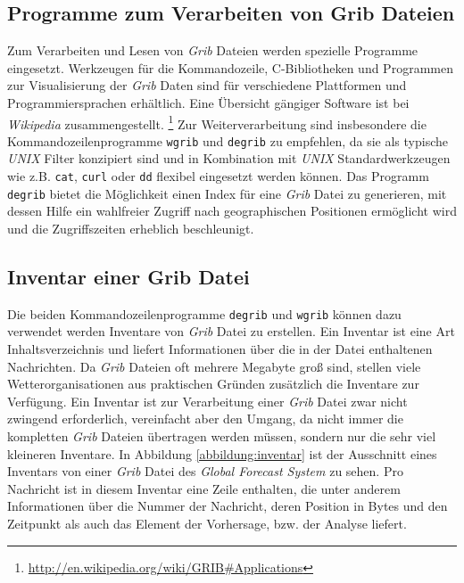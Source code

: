 \subsection{Programme zum Verarbeiten von Grib Dateien}
\label{grib-reader}

Zum Verarbeiten und Lesen von \textit{Grib} Dateien werden spezielle
Programme eingesetzt. Werkzeugen für die Kommandozeile, C-Bibliotheken
und Programmen zur Visualisierung der \textit{Grib} Daten sind für
verschiedene Plattformen und Programmiersprachen erhältlich. Eine
Übersicht gängiger Software ist bei \textit{Wikipedia}
zusammengestellt.
\footnote{\url{http://en.wikipedia.org/wiki/GRIB\#Applications}} Zur
Weiterverarbeitung sind insbesondere die Kommandozeilenprogramme
\texttt{wgrib} und \texttt{degrib} zu empfehlen, da sie als typische
\textit{UNIX} Filter konzipiert sind und in Kombination mit
\textit{UNIX} Standardwerkzeugen wie z.B. \texttt{cat}, \texttt{curl}
oder \texttt{dd} flexibel eingesetzt werden können. Das Programm
\texttt{degrib} bietet die Möglichkeit einen Index für eine
\textit{Grib} Datei zu generieren, mit dessen Hilfe ein wahlfreier
Zugriff nach geographischen Positionen ermöglicht wird und die
Zugriffszeiten erheblich beschleunigt.

\subsection{Inventar einer Grib Datei}

Die beiden Kommandozeilenprogramme \texttt{degrib} und \texttt{wgrib}
können dazu verwendet werden Inventare von \textit{Grib} Datei zu
erstellen. Ein Inventar ist eine Art Inhaltsverzeichnis und liefert
Informationen über die in der Datei enthaltenen Nachrichten. Da
\textit{Grib} Dateien oft mehrere Megabyte groß sind, stellen viele
Wetterorganisationen aus praktischen Gründen zusätzlich die Inventare
zur Verfügung. Ein Inventar ist zur Verarbeitung einer \textit{Grib}
Datei zwar nicht zwingend erforderlich, vereinfacht aber den Umgang,
da nicht immer die kompletten \textit{Grib} Dateien übertragen werden
müssen, sondern nur die sehr viel kleineren Inventare. In Abbildung
\ref{abbildung:inventar} ist der Ausschnitt eines Inventars von einer
\textit{Grib} Datei des \textit{Global Forecast System} zu sehen. Pro
Nachricht ist in diesem Inventar eine Zeile enthalten, die unter
anderem Informationen über die Nummer der Nachricht, deren Position in
Bytes und den Zeitpunkt als auch das Element der Vorhersage, bzw. der
Analyse liefert.

